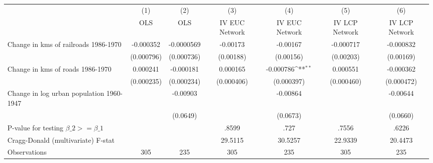 {
\def\sym#1{\ifmmode^{#1}\else\(^{#1}\)\fi}
\begin{tabular}{l*{6}{c}}
\hline\hline
                &\multicolumn{1}{c}{(1)}&\multicolumn{1}{c}{(2)}&\multicolumn{1}{c}{(3)}&\multicolumn{1}{c}{(4)}&\multicolumn{1}{c}{(5)}&\multicolumn{1}{c}{(6)}\\
                &\multicolumn{1}{c}{OLS}&\multicolumn{1}{c}{OLS}&\multicolumn{1}{c}{IV EUC Network}&\multicolumn{1}{c}{IV EUC Network}&\multicolumn{1}{c}{IV LCP Network}&\multicolumn{1}{c}{IV LCP Network}\\
\hline
Change in kms of railroads 1986-1970&-0.000352         &-0.0000569         & -0.00173         & -0.00167         &-0.000717         &-0.000832         \\
                &(0.000796)         &(0.000736)         &(0.00188)         &(0.00156)         &(0.00203)         &(0.00169)         \\
[1em]
Change in kms of roads 1986-1970& 0.000241         &-0.000181         & 0.000165         &-0.000786\sym{**} & 0.000551         &-0.000362         \\
                &(0.000235)         &(0.000234)         &(0.000406)         &(0.000397)         &(0.000460)         &(0.000472)         \\
[1em]
Change in log urban population 1960-1947&                  & -0.00903         &                  & -0.00864         &                  & -0.00644         \\
                &                  & (0.0649)         &                  & (0.0673)         &                  & (0.0660)         \\
\hline
P-value for testing $\beta\_{2} >= \beta\_{1}$&                  &                  &    .8599         &     .727         &    .7556         &    .6226         \\
Cragg-Donald (multivariate) F-stat&                  &                  &  29.5115         &  30.5257         &  22.9339         &  20.4473         \\
Observations    &      305         &      235         &      305         &      235         &      305         &      235         \\
\hline\hline
\end{tabular}
}
